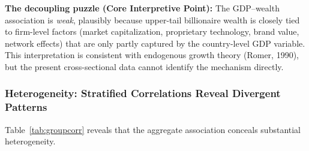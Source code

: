 \documentclass[a4paper,10pt]{article}
\begin{document}
\bigskip

\textbf{The decoupling puzzle (Core Interpretive Point):} The GDP--wealth association is \emph{weak}, plausibly because upper-tail billionaire wealth is closely tied to firm-level factors (market capitalization, proprietary technology, brand value, network effects) that are only partly captured by the country-level GDP variable. This interpretation is consistent with endogenous growth theory (Romer, 1990), but the present cross-sectional data cannot identify the mechanism directly.

\subsubsection{Heterogeneity: Stratified Correlations Reveal Divergent Patterns}
Table~\ref{tab:groupcorr} reveals that the aggregate association conceals substantial heterogeneity.

\begin{table}[H]
\centering
\caption{Stratified correlations: Pearson $r$ and Spearman $\rho$ for $\log\_finalWorth \sim \log\_gdp$ by industry category and self-made status. $\rho$ ranges from $-0.07$ (Healthcare) to $0.29$ (Real Estate), revealing that the overall association is an average of structurally different sub-populations.}
\label{tab:groupcorr}
\small

\end{table}
\end{document}
